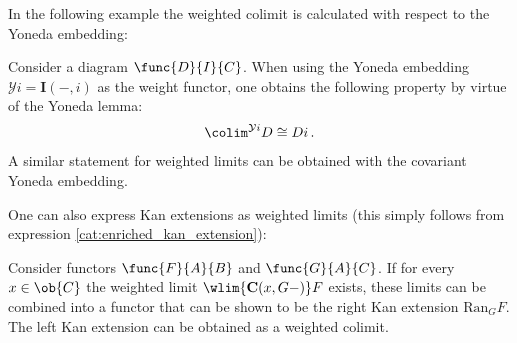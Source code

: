     In the following example the weighted colimit is calculated with respect to the Yoneda embedding:
    \begin{example}
        Consider a diagram $\func{D}{I}{C}$. When using the Yoneda embedding $\mathcal{Y}i = \mathbf{I}(-,i)$ as the weight functor, one obtains the following property by virtue of the Yoneda lemma:
        \begin{gather}
            \label{cat:weighted_hom_colimit}
            \colim^{\mathcal{Y}i}D\cong Di\,.
        \end{gather}
        A similar statement for weighted limits can be obtained with the covariant Yoneda embedding.
    \end{example}

    One can also express Kan extensions as weighted limits (this simply follows from expression \ref{cat:enriched_kan_extension}):
    \begin{property}
        Consider functors $\func{F}{A}{B}$ and $\func{G}{A}{C}$. If for every $x\in\ob{C}$ the weighted limit $\wlim{\mathbf{C}(x,G-)}F$ exists, these limits can be combined into a functor that can be shown to be the right Kan extension $\mathrm{Ran}_GF$. The left Kan extension can be obtained as a weighted colimit.
    \end{property}

